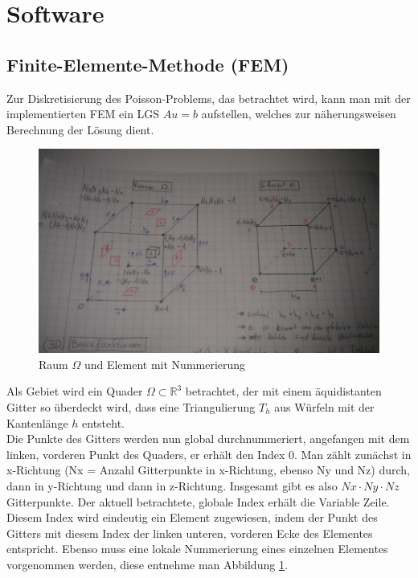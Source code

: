 \section{Software}

\subsection{Finite-Elemente-Methode (FEM)}
Zur Diskretisierung des Poisson-Problems, das betrachtet wird, kann man mit der implementierten FEM ein LGS $A u = b$ aufstellen, welches zur näherungsweisen Berechnung der Lösung dient. \\

\begin{figure}[h]
	\begin{center}
		\includegraphics[scale=0.15]{./Bilder/draft}
		
		\caption{Raum $\Omega$ und Element mit Nummerierung}\label{draft}
	\end{center}
\end{figure}

Als Gebiet wird ein Quader $\Omega \subset \mathbb{R}^{3}$ betrachtet, der mit einem äquidistanten Gitter so überdeckt wird, dass eine Triangulierung $T_h$ aus Würfeln mit der Kantenlänge $h$ entsteht. \\
Die Punkte des Gitters werden nun global durchnummeriert, angefangen mit dem linken, vorderen Punkt des Quaders, er erhält den Index 0. Man zählt zunächst in x-Richtung (Nx = Anzahl Gitterpunkte in x-Richtung, ebenso Ny und Nz) durch, dann in y-Richtung und dann in z-Richtung. Insgesamt gibt es also $Nx \cdot Ny \cdot Nz$ Gitterpunkte. Der aktuell betrachtete, globale Index erhält die Variable \glqq Zeile\grqq. Diesem Index wird eindeutig ein Element zugewiesen, indem der Punkt des Gitters mit diesem Index der linken unteren, vorderen Ecke des Elementes entspricht. Ebenso muss eine lokale Nummerierung eines einzelnen Elementes vorgenommen werden, diese entnehme man Abbildung \ref{draft}.\\

